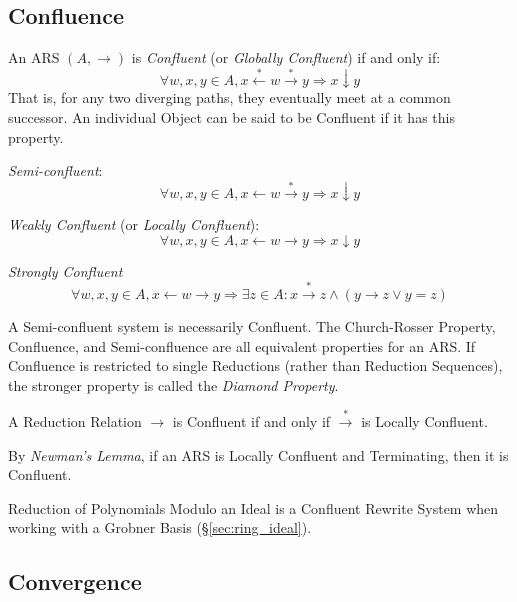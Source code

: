 \subsection{Confluence}\label{sec:rewrite_confluence}

An ARS $(A, \rightarrow)$ is \emph{Confluent} (or \emph{Globally
  Confluent}) if and only if:
\[
  \forall w,x,y \in A,
  x \stackrel{*}\leftarrow w \stackrel{*}\rightarrow y
  \Rightarrow x \downarrow y
\]
That is, for any two diverging paths, they eventually meet at a common
successor. An individual Object can be said to be Confluent if it has
this property.

\emph{Semi-confluent}:
\[
  \forall w,x,y \in A,
  x \leftarrow w \stackrel{*}\rightarrow y
  \Rightarrow x \downarrow y
\]

\emph{Weakly Confluent} (or \emph{Locally Confluent}):
\[
  \forall w,x,y \in A,
  x \leftarrow w \rightarrow y \Rightarrow x \downarrow y
\]

\emph{Strongly Confluent}
\[
  \forall w,x,y \in A,
  x \leftarrow w \rightarrow y \Rightarrow
  \exists z \in A : x \stackrel{*}\rightarrow z \wedge
  (y \rightarrow z \vee y = z)
\]

A Semi-confluent system is necessarily Confluent. The Church-Rosser
Property, Confluence, and Semi-confluence are all equivalent
properties for an ARS. If Confluence is restricted to single
Reductions (rather than Reduction Sequences), the stronger property is
called the \emph{Diamond Property}.

A Reduction Relation $\rightarrow$ is Confluent if and only if
$\stackrel{*}\rightarrow$ is Locally Confluent.

By \emph{Newman's Lemma}, if an ARS is Locally Confluent and
Terminating, then it is Confluent.

Reduction of Polynomials Modulo an Ideal is a Confluent Rewrite System
when working with a Grobner Basis (\S\ref{sec:ring_ideal}).



\subsection{Convergence}\label{sec:rewrite_convergence}

